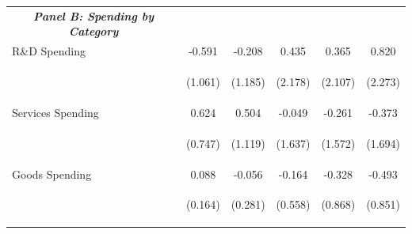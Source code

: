 \documentclass[dv_diss_main.tex]{subfiles}
\begin{document}
\begin{table}[H]
\begin{center}
{\begin{tabular}{lccccc}
    \multicolumn{1}{c}{\textit{\textbf{Panel B: Spending by Category}}} \\ 
    R\&D Spending & -0.591 & -0.208 & 0.435 & 0.365 & 0.820 \\
    \vspace{4pt} & \begin{footnotesize}(1.061)\end{footnotesize} & \begin{footnotesize}(1.185)\end{footnotesize} & \begin{footnotesize}(2.178)\end{footnotesize} & \begin{footnotesize}(2.107)\end{footnotesize} & \begin{footnotesize}(2.273)\end{footnotesize} \\
    Services Spending & 0.624 & 0.504 & -0.049 & -0.261 & -0.373 \\
    \vspace{4pt} & \begin{footnotesize}(0.747)\end{footnotesize} & \begin{footnotesize}(1.119)\end{footnotesize} & \begin{footnotesize}(1.637)\end{footnotesize} & \begin{footnotesize}(1.572)\end{footnotesize} & \begin{footnotesize}(1.694)\end{footnotesize} \\
    Goods Spending & 0.088 & -0.056 & -0.164 & -0.328 & -0.493 \\
     & \begin{footnotesize}(0.164)\end{footnotesize} & \begin{footnotesize}(0.281)\end{footnotesize} & \begin{footnotesize}(0.558)\end{footnotesize} & \begin{footnotesize}(0.868)\end{footnotesize} & \begin{footnotesize}(0.851)\end{footnotesize} \\


\end{tabular}}
\end{center}
\end{table}
\end{document}

